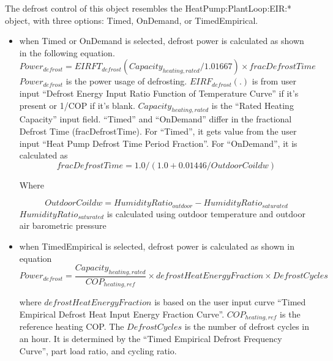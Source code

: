 The defrost control of this object resembles the HeatPump:PlantLoop:EIR:*
object, with three options: Timed, OnDemand, or TimedEmpirical.
\begin{itemize}
  \item 
when Timed or OnDemand is selected, defrost power is calculated as shown in
the following equation.
\begin{equation}
Power_{defrost} = EIRFT_{defrost}(Capacity_{heating,rated}/1.01667) \times fracDefrostTime  
\end{equation}
$Power_{defrost}$ is the power usage of defrosting.
$EIRF_{defrost}(.)$ is from user input ``Defrost Energy Input Ratio Function of
Temperature Curve'' if it's present or 1/COP if it's blank. $Capacity_{heating,rated}$
is the ``Rated Heating Capacity'' input field. ``Timed'' and ``OnDemand'' differ in
the fractional Defrost Time (fracDefrostTime). For ``Timed'', it gets value from
the user input ``Heat Pump Defrost Time Period Fraction''. For ``OnDemand'', it is
calculated as 
\begin{equation}
fracDefrostTime =1.0 / (1.0 + 0.01446 / OutdoorCoildw) 
\end{equation}

Where

\begin{equation}
OutdoorCoildw=HumidityRatio_{outdoor}-HumidityRatio_{saturated}              
\end{equation}
$HumidityRatio_{saturated}$ is calculated using outdoor temperature and outdoor air barometric pressure

\item when TimedEmpirical is selected, defrost power is calculated as shown in equation 
\begin{equation}
Power_{defrost}=\frac{Capacity_{heating,rated}}{COP_{heating,ref}} \times
defrostHeatEnergyFraction \times DefrostCycles                                           
\end{equation}

where $defrostHeatEnergyFraction$ is based on the user input curve ``Timed Empirical Defrost Heat Input Energy Fraction Curve''. 
$COP_{heating,ref}$ is the reference heating COP. The $DefrostCycles$ is the number of defrost cycles in an hour. 
It is determined by the ``Timed Empirical Defrost Frequency Curve'', part load ratio, and cycling ratio.

\end{itemize}

